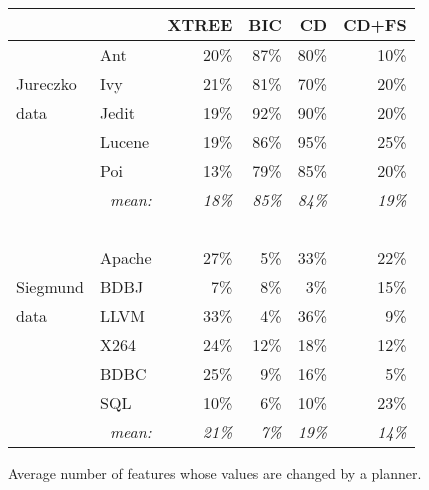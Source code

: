 \begin{figure}[!b]
\centering
{\small
\begin{tabular}{l|lrrrr}
  \hline
  \rowcolor{lightgray}
 &       & XTREE & BIC   & CD   &CD+FS \\\hline
&Ant    & 20\% & 87\% & 80\% & 10\%  \\
Jureczko&Ivy    & 21\% & 81\% & 70\% & 20\%  \\
data&Jedit  & 19\% & 92\% & 90\% & 20\%  \\
&Lucene & 19\% & 86\% & 95\% & 25\%  \\
&Poi    & 13\% & 79\% & 85\% & 20\%   \\\hline
\multicolumn{2}{r}{{\em mean:}}& {\em 18\%} & {\em 85\%} & {\em 84\%} & {\em 19\%}\\
\multicolumn{2}{r}{~}\\\hline
 &Apache & 27\% & 5\% & 33\% & 22\% \\
Siegmund&BDBJ & 7\% & 8\% & 3\% & 15\% \\
data&LLVM & 33\% & 4\% & 36\% & 9\% \\
&X264 & 24\% & 12\% & 18\% & 12\% \\
&BDBC & 25\% & 9\% & 16\% & 5\% \\
&SQL & 10\% & 6\% & 10\% & 23\% \\\hline
\multicolumn{2}{r}{{\em mean:}} & {\em 21\% } & {\em 7\% } & {\em 19\% } & {\em 14\%}
\end{tabular}}
\noindent
\caption{Average number of features whose values are changed by a planner.}\label{fig:types}
\end{figure}